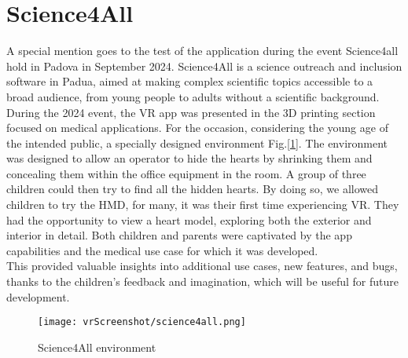 \section{Science4All}
\noindent
A special mention goes to the test of the application during the event Science4all hold in Padova in September 2024.
Science4All is a science outreach and inclusion software in Padua, aimed at making complex scientific topics accessible to a broad audience,
from young people to adults without a scientific background.\\
During the 2024 event, the \ac{VR} app was presented in the 3D printing section focused on medical applications.
For the occasion, considering the young age of the intended public, a specially designed environment Fig.[\ref{fig:science4all}].
The environment was designed to allow an operator to hide the hearts by shrinking them and concealing them within the office equipment in the room. A group of three children could then try to find all the hidden hearts.
By doing so, we allowed children to try the \ac{HMD}, for many, it was their first time experiencing \ac{VR}. They had the opportunity to view a heart model, exploring both the exterior and interior in detail.
Both children and parents were captivated by the app capabilities and the medical use case for which it was developed.\\
This provided valuable insights into additional use cases, new features, and bugs, thanks to the children's feedback and imagination, which will be useful for future development.


\begin{figure}[hb]
  \centering
  \texttt{[image: vrScreenshot/science4all.png]}
  \caption{Science4All environment}
  \label{fig:science4all}
\end{figure}